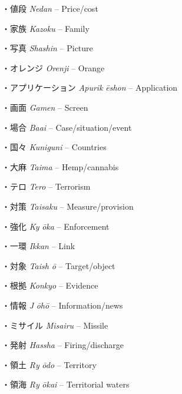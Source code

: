 \par{・値段  \emph{Nedan }– Price\slash cost }
 
\par{・家族  \emph{Kazoku }– Family }
 
\par{・写真  \emph{Shashin }– Picture }
 
\par{・オレンジ  \emph{Orenji }– Orange }
 
\par{・アプリケーション  \emph{Apurik }\emph{ēshon }– Application }
 
\par{・画面  \emph{Gamen }– Screen }
 
\par{・場合  \emph{Ba\textquotesingle ai }– Case\slash situation\slash event }
 
\par{・国々  \emph{Kuniguni }– Countries }
 
\par{・大麻  \emph{Taima }– Hemp\slash cannabis }
 
\par{・テロ  \emph{Tero }– Terrorism }
 
\par{・対策  \emph{Taisaku }– Measure\slash provision }
 
\par{・強化  \emph{Ky }\emph{ōka }– Enforcement }
 
\par{・一環  \emph{Ikkan }– Link }
 
\par{・対象  \emph{Taish }\emph{ō }– Target\slash object }
 
\par{・根拠  \emph{Konkyo }– Evidence }
 
\par{・情報  \emph{J }\emph{ōhō }– Information\slash news }
 
\par{・ミサイル  \emph{Misairu }– Missile }
 
\par{・発射  \emph{Hassha }– Firing\slash discharge }
 
\par{・領土  \emph{Ry }\emph{ōdo }– Territory }
 
\par{・領海  \emph{Ry }\emph{ōkai }– Territorial waters }
 
